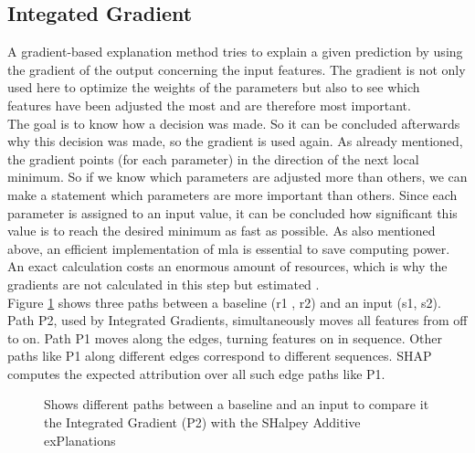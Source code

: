 \subsection{Integated Gradient}
\label{subsec:ig}

A gradient-based explanation method tries to explain a given prediction by using the gradient of the output concerning the input features. The gradient is not only used here to optimize the weights of the parameters but also to see which features have been adjusted the most and are therefore most important. \\

The goal is to know how a decision was made. So it can be concluded afterwards why this decision was made, so the gradient is used again. As already mentioned, the gradient points (for each parameter) in the direction of the next local minimum. So if we know which parameters are adjusted more than others, we can make a statement which parameters are more important than others. Since each parameter is assigned to an input value, it can be concluded how significant this value is to reach the desired minimum as fast as possible. As also mentioned above, an efficient implementation of \gls{mla} is essential to save computing power. An exact calculation costs an enormous amount of resources, which is why the gradients are not calculated in this step but estimated \cite{molnar2019} \cite{TjoaGuan} \cite{Mukund}.\\

Figure \ref{fig:ig} shows three paths between a baseline (r1 , r2) and an input (s1, s2). Path P2, used by Integrated Gradients, simultaneously moves all features from off to on. Path P1 moves along the edges, turning features on in sequence. Other paths like P1 along different edges correspond to different sequences. SHAP computes the expected attribution over all such edge paths like P1.\\

\begin{figure}[htp]
	\centering
	\caption{Shows different paths between a baseline and an input to compare it the Integrated Gradient (P2) with the SHalpey Additive exPlanations\cite{TjoaGuan}}
	\label{fig:ig}
\end{figure}

